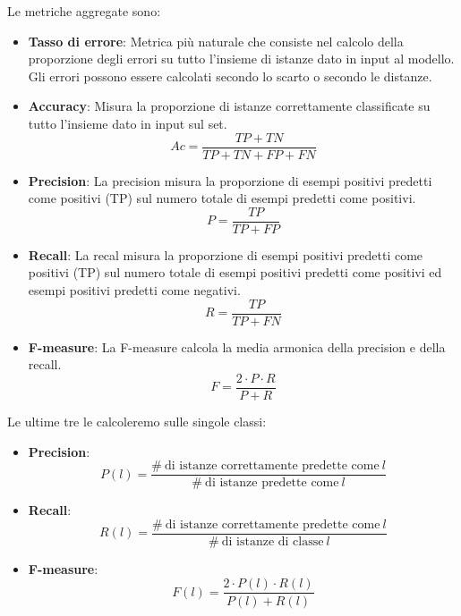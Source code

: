 Le metriche aggregate sono:
\begin{itemize}
    \item \textbf{Tasso di errore}:
    Metrica più naturale che consiste nel calcolo della proporzione degli errori su 
    tutto l'insieme di istanze dato in input al modello. Gli errori possono essere 
    calcolati secondo lo scarto o secondo le distanze.
    \item \textbf{Accuracy}:
    Misura la proporzione di istanze correttamente classificate su tutto l'insieme
    dato in input sul set.
    \begin{equation}
        Ac = \frac{TP+TN}{TP+TN+FP+FN}
    \end{equation}
    \item \textbf{Precision}:
    La precision misura la proporzione di esempi positivi predetti come positivi (TP)
    sul numero totale di esempi predetti come positivi.
    \begin{equation}
        P=\frac{TP}{TP+FP}
    \end{equation}
    \item \textbf{Recall}:
    La recal misura la proporzione di esempi positivi predetti come positivi (TP) sul
    numero totale di esempi positivi predetti come positivi ed esempi positivi predetti
    come negativi.
    \begin{equation}
        R=\frac{TP}{TP+FN}
    \end{equation}
    \item \textbf{F-measure}:
    La F-measure calcola la media armonica della precision e della recall.
    \begin{equation}
        F = \frac{2\cdot P\cdot R}{P+R}
    \end{equation}
\end{itemize}

Le ultime tre le calcoleremo sulle singole classi:
\begin{itemize}
    \item \textbf{Precision}:
    \begin{equation}
        P(l)=\frac{\# \ \text{di istanze correttamente predette come} \ l}{\# 
        \ \text{di istanze predette come} \ l}
    \end{equation}
    \item \textbf{Recall}:
    \begin{equation}
        R(l)=\frac{\# \ \text{di istanze correttamente predette come} \ l}{\# 
        \ \text{di istanze di classe} \ l}
    \end{equation}
    \item \textbf{F-measure}:
    \begin{equation}
        F(l) = \frac{2\cdot P(l)\cdot R(l)}{P(l)+R(l)}
    \end{equation}
\end{itemize}

